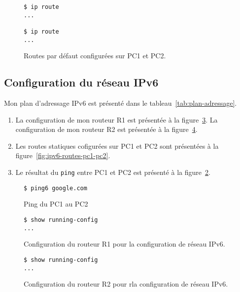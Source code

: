 \documentclass[]{article}
\begin{document}
\begin{figure} 
      \centering
      \begin{lstlisting}
$ ip route
...

$ ip route
...
      \end{lstlisting}
      \caption[]{Routes par défaut configurées sur PC1 et PC2.}
      \label{fig:routes-pc1-pc2}
\end{figure}

\subsection*{Configuration du réseau IPv6}

Mon plan d'adressage IPv6 est présenté dans le tableau~\ref{tab:plan-adressage}.

\begin{enumerate}
      \item La configuration de mon routeur R1 est présentée à la figure~\ref{fig:ipv6-config-r1}. La configuration
            de mon routeur R2 est présentée à la figure~\ref{fig:ipv6-config-r2}.
      \item Les routes statiques cofigurées sur PC1 et PC2 sont présentées à la figure~\ref{fig:ipv6-routes-pc1-pc2}.
      \item  Le résultat du \texttt{ping} entre PC1 et PC2 est présenté à la figure~\ref{fig:ping6-pc1-pc2}.
\end{enumerate}

\begin{figure} 
      \centering
      \begin{lstlisting}
$ ping6 google.com
      \end{lstlisting}
      \caption[]{Ping du PC1 au PC2}
      \label{fig:ping6-pc1-pc2}
\end{figure}

\begin{figure} 
      \centering
      \begin{lstlisting}
$ show running-config
...
      \end{lstlisting}
      \caption[]{Configuration du routeur R1 pour la configuration de réseau IPv6.}
      \label{fig:ipv6-config-r1}
\end{figure}

\begin{figure} 
      \centering
      \begin{lstlisting}
$ show running-config 
...
      \end{lstlisting}
      \caption[]{Configuration du routeur R2 pour rla configuration de réseau IPv6.}
      \label{fig:ipv6-config-r2}
\end{figure}
\end{document}
